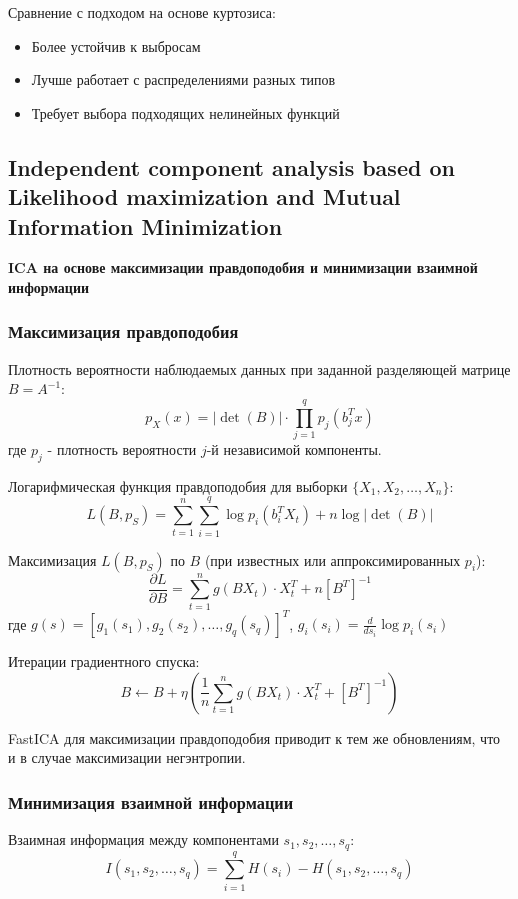 \documentclass[a4paper,12pt]{article}
\begin{document}
Сравнение с подходом на основе куртозиса:
\begin{itemize}
    \item Более устойчив к выбросам
    \item Лучше работает с распределениями разных типов
    \item Требует выбора подходящих нелинейных функций
\end{itemize}

\subsection{Independent component analysis based on Likelihood maximization and Mutual Information Minimization}

\textbf{ICA на основе максимизации правдоподобия и минимизации взаимной информации}

\subsubsection{Максимизация правдоподобия}

Плотность вероятности наблюдаемых данных при заданной разделяющей матрице $B = A^{-1}$:
$$p_X(x) = |\det(B)| \cdot \prod_{j=1}^q p_j(b_j^T x)$$
где $p_j$ - плотность вероятности $j$-й независимой компоненты.

Логарифмическая функция правдоподобия для выборки $\{X_1, X_2, \ldots, X_n\}$:
$$L(B, p_S) = \sum_{t=1}^n \sum_{i=1}^q \log p_i(b_i^T X_t) + n \log|\det(B)|$$

Максимизация $L(B, p_S)$ по $B$ (при известных или аппроксимированных $p_i$):
$$\frac{\partial L}{\partial B} = \sum_{t=1}^n g(BX_t) \cdot X_t^T + n[B^T]^{-1}$$
где $g(s) = [g_1(s_1), g_2(s_2), \ldots, g_q(s_q)]^T$, $g_i(s_i) = \frac{d}{ds_i} \log p_i(s_i)$

Итерации градиентного спуска:
$$B \leftarrow B + \eta \left(\frac{1}{n}\sum_{t=1}^n g(BX_t) \cdot X_t^T + [B^T]^{-1}\right)$$

FastICA для максимизации правдоподобия приводит к тем же обновлениям, что и в случае максимизации негэнтропии.

\subsubsection{Минимизация взаимной информации}

Взаимная информация между компонентами $s_1, s_2, \ldots, s_q$:
$$I(s_1, s_2, \ldots, s_q) = \sum_{i=1}^q H(s_i) - H(s_1, s_2, \ldots, s_q)$$
\end{document}
